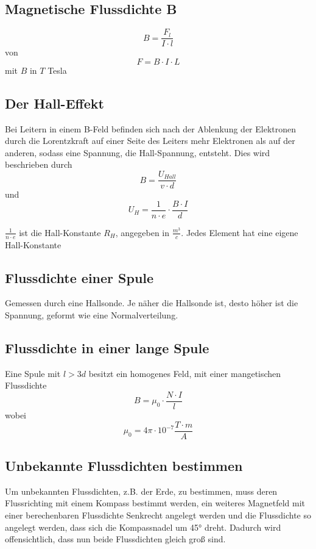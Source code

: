 \documentclass{article}\usepackage[a4paper]{geometry}
\begin{document}
\subsection{Magnetische Flussdichte B} 
\[B=\frac{F_l}{I \cdot l}\]
von 
\[F=B \cdot I \cdot L\]
mit $B$ in $T$ Tesla 
 
\subsection{Der Hall-Effekt} 
Bei Leitern in einem B-Feld befinden sich nach der Ablenkung der Elektronen durch die Lorentzkraft auf einer Seite des Leiters mehr Elektronen als auf der anderen, sodass eine Spannung, die Hall-Spannung, entsteht. Dies wird beschrieben durch
\[B=\frac{U_{Hall}}{v \cdot d}\] 
und
\[U_H=\frac{1}{n \cdot e} \cdot \frac{B \cdot I}{d}\] 
 
\noindent $\frac{1}{n \cdot e}$ ist die Hall-Konstante $R_H$, angegeben in $\frac{m^3}{c}$. Jedes Element hat eine eigene Hall-Konstante
 
\subsection{Flussdichte einer Spule}
Gemessen durch eine Hallsonde. Je näher die Hallsonde ist, desto höher ist die Spannung, geformt wie eine Normalverteilung.
 
\subsection{Flussdichte in einer lange Spule}
Eine Spule mit $l>3d$ besitzt ein homogenes Feld, mit einer mangetischen Flussdichte
\[B=\mu_0 \cdot \frac{N \cdot I}{l}\]
wobei
\[\mu_0 = 4\pi \cdot 10^{-7} \frac{T \cdot m}{A}\]
 
\subsection{Unbekannte Flussdichten bestimmen} 
Um unbekannten Flussdichten, z.B. der Erde, zu bestimmen, muss deren Flussrichting mit einem Kompass bestimmt werden, ein weiteres Magnetfeld mit einer berechenbaren Flussdichte Senkrecht angelegt werden und die Flussdichte so angelegt werden, dass sich die Kompassnadel um 45° dreht. Dadurch wird offensichtlich, dass nun beide Flussdichten gleich groß sind.
 
\end{document}

